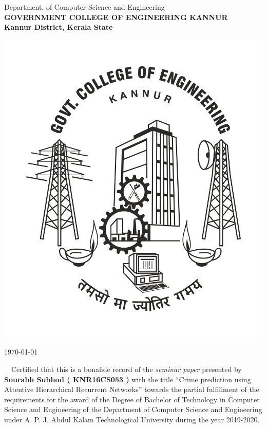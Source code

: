 \begin{center}
     { {\sc Department. of Computer Science and Engineering}}\\
     {\bf \MakeUppercase{Government College  of Engineering Kannur}}\\
     {\bf Kannur District, Kerala State}\\ \bigskip   
        
      \vspace*{25pt}
      \centerline{\includegraphics [keepaspectratio=true, scale=.2]{gcek.jpg}}
      \vspace*{2cm}
      \textbf{\large {}}
      \vspace*{1cm}     
\end{center}

\begin{flushright}
{\today}\\ \bigskip                                  
\end{flushright}

\jadafont
  {~~Certified that this  is a bonafide record of the {\em seminar paper} presented by {\bf Sourabh Subhod (  
  {KNR16CS053} )} with the title ``{{\sc \large Crime prediction using Attentive Hierarchical
  Recurrent Networks}}'' towards the partial fulfillment of the 
  requirements for the award of the Degree of Bachelor of Technology in Computer Science and Engineering of the 
  Department of Computer Science and Engineering under A. P. J. Abdul Kalam Technological University
  during the year 2019-2020.
  }
  
